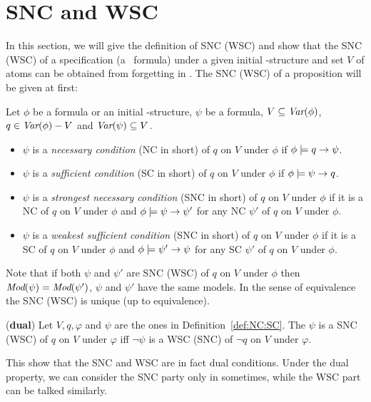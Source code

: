 \documentclass{article}
\begin{document}
\section{SNC and WSC}
In this section, we will give the definition of SNC (WSC) and show that the SNC (WSC) of a specification (a \CTL\ formula) under a given initial \MPK-structure and set $V$ of atoms can be obtained from forgetting in \CTL.
The SNC (WSC) of a proposition will be given at first:
\begin{definition}\label{def:NC:SC}
Let $\phi$ be a formula or an initial \MPK-structure, $\psi$ be a formula, $V \subseteq \textit{Var}(\phi)$, $q\in\textit{Var}(\phi)-V$
and $\textit{Var}(\psi)\subseteq V$.
\begin{itemize}
  \item $\psi$  is a {\em necessary condition} (NC in short) of $q$ on $V$ under $\phi$
    if $\phi \models q \rightarrow \psi$.
  \item $\psi$  is a {\em sufficient condition} (SC in short) of $q$ on $V$ under $\phi$
    if $\phi \models \psi\rightarrow q$.
  \item $\psi$  is a {\em strongest necessary condition} (SNC in short)
  of $q$ on $V$ under $\phi$
    if it is a NC of $q$ on $V$ under $\phi$ and $\phi\models\psi\rightarrow\psi'$
    for any NC $\psi'$ of $q$ on $V$ under $\phi$.

    \item $\psi$  is a {\em weakest sufficient condition} (SNC in short)
  of $q$ on $V$ under $\phi$
    if it is a SC of $q$ on $V$ under $\phi$ and $\phi\models\psi'\rightarrow\psi$
    for any SC $\psi'$ of $q$ on $V$ under $\phi$.
\end{itemize}
\end{definition}
Note that if both $\psi$ and $\psi'$ are SNC (WSC) of $q$ on $V$ under $\phi$ then
$\textit{Mod}(\psi)=\textit{Mod}(\psi')$, \ie $\psi$ and $\psi'$ have the same models. In the sense
of equivalence the SNC (WSC) is unique (up to equivalence).



\begin{proposition}\label{dual}
(\textbf{dual})
 Let $V,q,\varphi$ and $\psi$ are the ones in Definition~\ref{def:NC:SC}.
 The $\psi$ is a SNC (WSC) of $q$ on $V$ under $\varphi$ iff $\neg \psi$ is a WSC (SNC)
    of $\neg q$ on $V$ under $\varphi$.
\end{proposition}
This show that the SNC and WSC are in fact dual conditions. Under the dual property, we can consider the SNC party only in sometimes, while
the WSC part can be talked similarly.
%
\end{document}
